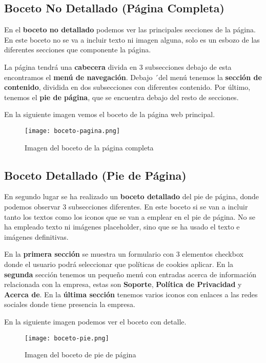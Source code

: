 \subsection{Boceto No Detallado (Página Completa)}

En el \textbf{boceto no detallado} podemos ver las principales secciones de la página. En este boceto no se va a incluir texto ni imagen alguna, solo es un esbozo de las diferentes secciones que componente la página.

La página tendrá una \textbf{cabecera} divida en 3 subsecciones debajo de esta encontramos el \textbf{menú de navegación}. Debajo ´del menú tenemos la \textbf{sección de contenido}, dividida en dos subsecciones con diferentes contenido. Por último, tenemos el \textbf{pie de página}, que se encuentra debajo del resto de secciones.

En la siguiente imagen vemos el boceto de la página web principal.

\begin{figure}[H]
    \centering
    \texttt{[image: boceto-pagina.png]}
    \caption{Imagen del boceto de la página completa}
\end{figure}

\subsection{Boceto Detallado (Pie de Página)}

En segundo lugar se ha realizado un \textbf{boceto detallado} del pie de página, donde podemos observar 3 subsecciones diferentes. En este boceto si se van a incluir tanto los textos como los iconos que se van a emplear en el pie de página. No se ha empleado texto ni imágenes placeholder, sino que se ha usado el texto e imágenes definitivas.

En la \textbf{primera sección} se muestra un formulario con 3 elementos checkbox donde el usuario podrá seleccionar que políticas de cookies aplicar. En la \textbf{segunda} sección tenemos un pequeño menú con entradas acerca de información relacionada con la empresa, estas son \textbf{Soporte}, \textbf{Política de Privacidad} y \textbf{Acerca de}. En la \textbf{última sección} tenemos varios iconos con enlaces a las redes sociales donde tiene presencia la empresa.

En la siguiente imagen podemos ver el boceto con detalle.
\begin{figure}[H]
    \centering
    \texttt{[image: boceto-pie.png]}
    \caption{Imagen del boceto de pie de página}
\end{figure}

